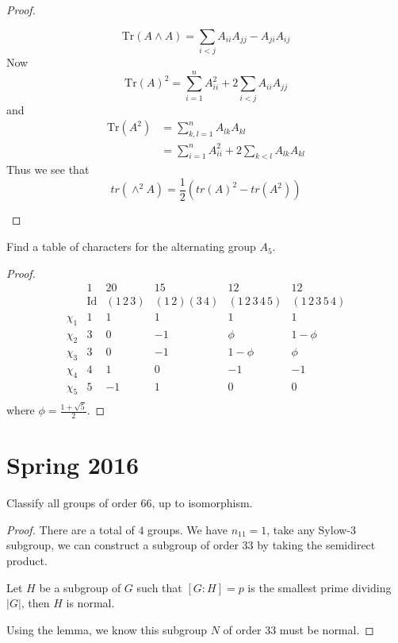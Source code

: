 \documentclass[openany]{book}
\begin{document}
\begin{proof}
\begin{itemize}
        \begin{equation*}
            \text{Tr}(A\wedge A)=\sum_{i<j}A_{ii}A_{jj}-A_{ji}A_{ij}
        \end{equation*}
        Now 
        \begin{equation*}
            \text{Tr}(A)^2=\sum_{i=1}^nA_{ii}^2+2\sum_{i<j}A_{ii}A_{jj}
        \end{equation*}
        and 
        \begin{align*}
            \text{Tr}(A^2)&=\sum_{k,l=1}^nA_{lk}A_{kl}\\
            &=\sum_{i=1}^nA_{ii}^2+2\sum_{k<l}A_{lk}A_{kl}
        \end{align*}
        Thus we see that 
        \[tr(\wedge^{2}A)=\frac{1}{2}(tr(A)^{2}-tr(A^{2}))\]
    \end{itemize}

\end{proof}

\begin{prob}
    Find a table of characters for the alternating group \(A_{5}\).
\end{prob}
\begin{proof}
    \[
\begin{array}{c|ccccc}
 & \text{1} & \text{20} & \text{15} & \text{12} & \text{12} \\ 
 & \text{Id} & (1\,2\,3) & (1\,2)(3\,4) & (1\,2\,3\,4\,5) & (1\,2\,3\,5\,4) \\ 
\hline
\chi_1 & 1 & 1 & 1 & 1 & 1 \\ 
\chi_2 & 3 & 0 & -1 & \phi & 1-\phi \\ 
\chi_3 & 3 & 0 & -1 & 1-\phi & \phi \\ 
\chi_4 & 4 & 1 & 0 & -1 & -1 \\ 
\chi_5 & 5 & -1 & 1 & 0 & 0 \\ 
\end{array}
\]
where $\phi=\frac{1+\sqrt{5}}{2}$.
\end{proof}


\chapter{Spring 2016}

\begin{prob}
    Classify all groups of order 66, up to isomorphism.
\end{prob}
\begin{proof}
    There are a total of $4$ groups. We have $n_{11}=1$, take any Sylow-$3$ subgroup, we can construct a subgroup of order $33$ by taking the semidirect product.
    \begin{lem}
        Let $H$ be a subgroup of $G$ such that $[G:H]=p$ is the smallest prime dividing $|G|$, then $H$ is normal.
    \end{lem}
    Using the lemma, we know this subgroup $N$ of order $33$ must be normal.
\end{proof}
\end{document}
